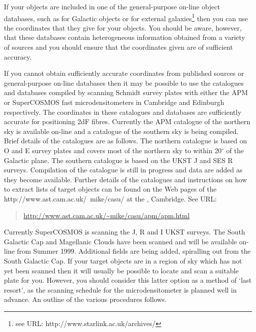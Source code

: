 \documentclass[chapters,twoside,11pt]{starlink}
\begin{document}
If your objects are included in one of the general-purpose on-line object
databases, such as
for Galactic objects or
for external galaxies\footnote{see URL:
{http://www.starlink.ac.uk/archives/}} then you can
use the coordinates that they give for your objects.  You should be aware,
however, that these databases contain heterogeneous information obtained
from a variety of sources and you should ensure that the coordinates given
are of sufficient accuracy.

If you cannot obtain sufficiently accurate coordinates from published
sources or general-purpose on-line databases then it may be possible to
use the catalogues and databases compiled by scanning Schmidt survey
plates with either the APM or SuperCOSMOS fast microdensitometers in
Cambridge and Edinburgh respectively.  The coordinates in these catalogues
and databases are sufficiently accurate for positioning 2dF fibres.
Currently the APM catalogue of the northern sky is available on-line
and a catalogue of the southern sky is being compiled.  Brief details
of the catalogues are as follows.  The northern catalogue is based on
O and E survey plates and covers most of the northern sky to within
20$^{\circ}$ of the Galactic plane.  The southern catalogue is based on
the UKST J and SES R  surveys.  Compilation of the catalogue is still in
progress and data are added as they become available.  Further details
of the catalogues and instructions on how to extract lists of target
objects can be found on the Web pages of the
{http://www.ast.cam.ac.uk/~mike/casu/} at the
,
Cambridge.  See URL:

\begin{quote}
\url{http://www.ast.cam.ac.uk/~mike/casu/apm/apm.html}
\end{quote}

Currently SuperCOSMOS is scanning the J, R and I UKST surveys.  The South
Galactic Cap and Magellanic Clouds have been scanned and will be available
on-line from Summer 1999.  Additional fields are being added, spiralling out
from the South Galactic Cap.  If your target objects are in a region of sky
which has not yet been scanned then it will usually be possible to locate and
scan a suitable plate for you.  However, you should consider this latter
option as a method of `last resort', as the scanning schedule for the
microdensitometer is planned well in advance.  An outline of the various
procedures follows.
\end{document}
